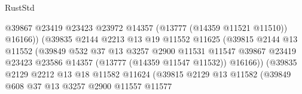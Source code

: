 \begin{lexlean}{RustStd}
\begin{coremodule}
                                          @39867
                                          @23419
                                          @23423
                                          @23972
                                          @14357
                                          (@13777 (@14359 @11521 @11510))
                                          @16166))
                                      (@39835
                                        @2144
                                        @2213
                                        @13
                                        @19
                                        @11552
                                        @11625
                                        (@39815
                                          @2144
                                          @13
                                          @11552
                                          (@39849
                                            @532
                                            @37
                                            @13
                                            @3257
                                            @2900
                                            @11531
                                            @11547
                                            @39867
                                            @23419
                                            @23423
                                            @23586
                                            @14357
                                            (@13777 (@14359 @11547 @11532))
                                            @16166))
                                        (@39835
                                          @2129
                                          @2212
                                          @13
                                          @18
                                          @11582
                                          @11624
                                          (@39815
                                            @2129
                                            @13
                                            @11582
                                            (@39849
                                              @608
                                              @37
                                              @13
                                              @3257
                                              @2900
                                              @11557
                                              @11577

\end{coremodule}
\end{lexlean}
